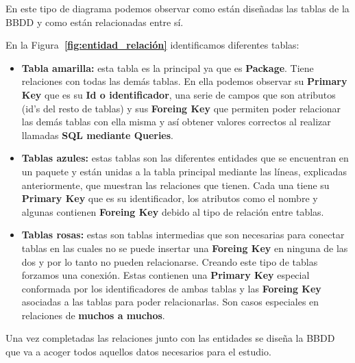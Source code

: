 \documentclass[a4paper, 12pt]{book}
\begin{document}
En este tipo de diagrama podemos observar como están diseñadas las tablas de la BBDD y como están relacionadas entre sí.

En la Figura\textbf {~\ref{fig:entidad_relación}} identificamos diferentes tablas:

\begin{itemize}
	\item \textbf {Tabla amarilla: }esta tabla es la principal ya que es \textbf {Package}. Tiene relaciones con todas las demás tablas. En ella podemos observar su \textbf {Primary Key} que es su \textbf {Id o identificador}, una serie de campos que son atributos (id's del resto de tablas) y sus \textbf {Foreing Key} que permiten poder relacionar las demás tablas con ella misma y así obtener valores correctos al realizar llamadas \textbf {SQL mediante Queries}.
	
	\item \textbf {Tablas azules: }estas tablas son las diferentes entidades que se encuentran en un paquete y están unidas a la tabla principal mediante las líneas, explicadas anteriormente, que muestran las relaciones que tienen.
	Cada una tiene su \textbf {Primary Key} que es su identificador, los atributos como el nombre y algunas contienen \textbf {Foreing Key} debido al tipo de relación entre tablas.
	
	\item \textbf {Tablas rosas: }estas son tablas intermedias que son necesarias para conectar tablas en las cuales no se puede insertar una \textbf {Foreing Key} en ninguna de las dos y por lo tanto no pueden relacionarse. Creando este tipo de tablas forzamos una conexión. Estas contienen una \textbf {Primary Key} especial conformada por los identificadores de ambas tablas y las \textbf {Foreing Key} asociadas a las tablas para poder relacionarlas.
	Son casos especiales en relaciones de \textbf {muchos a muchos}.
\end{itemize}

Una vez completadas las relaciones junto con las entidades se diseña la BBDD que va a acoger todos aquellos datos necesarios para el estudio.
\end{document}
